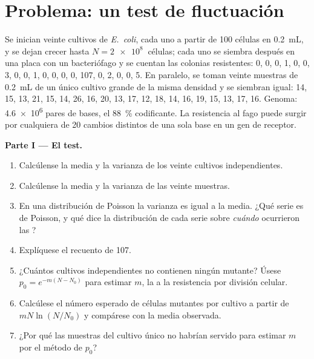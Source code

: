 \section{Problema: un test de fluctuación}

\begin{problem}
\label{pb:b2:genome-diversification:1}
Se inician veinte cultivos de \emph{E.~coli}, cada uno a partir de
\num{100} células en \qty{0.2}{mL}, y se dejan crecer hasta $N = \qty{2e8}{}$
células; cada uno se siembra después en una placa con un bacteriófago y
se cuentan las colonias resistentes: 0, 0, 0, 1, 0, 0, 3, 0, 0, 1, 0, 0,
0, 0, 107, 0, 2, 0, 0, 5. En paralelo, se toman veinte muestras de
\qty{0.2}{mL} de un único cultivo grande de la misma densidad y se
siembran igual: 14, 15, 13, 21, 15, 14, 26, 16, 20, 13, 17, 12, 18, 14,
16, 19, 15, 13, 17, 16. Genoma: \qty{4.6e6}{} pares de bases, el
\qty{88}{\%} codificante. La resistencia al fago puede surgir por
cualquiera de \num{20} cambios distintos de una sola base en un gen de
receptor.

\medskip
\noindent\textbf{Parte I --- El test.}
\begin{enumerate}
  \item Calcúlense la media y la varianza de los veinte cultivos
        independientes.
  \item Calcúlense la media y la varianza de las veinte muestras.
  \item En una distribución de Poisson la varianza es igual a la media.
        ¿Qué serie es de Poisson, y qué dice la distribución de cada serie
        sobre \emph{cuándo} ocurrieron las ?
  \item Explíquese el recuento de 107.
  \item ¿Cuántos cultivos independientes no contienen ningún mutante?
        Úsese $p_0 = e^{-m(N - N_0)}$ para estimar $m$, la  a la resistencia por división celular.
  \item Calcúlese el número esperado de células mutantes por cultivo a
        partir de $mN\ln(N/N_0)$ y compárese con la media observada.
  \item ¿Por qué las muestras del cultivo único no habrían servido para
        estimar $m$ por el método de $p_0$?
\end{enumerate}


\end{problem}
